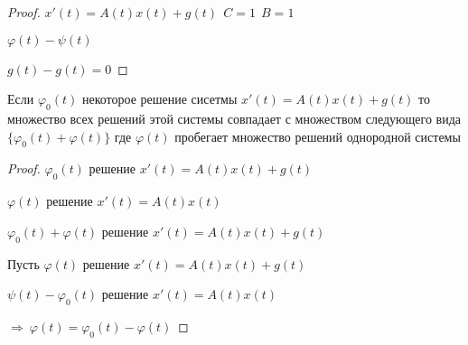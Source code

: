 \begin{proof}
  $x'(t) = A(t)x(t) + g(t) ~~ C = 1 ~~ B = 1$

  $\varphi(t) - \psi(t)$

  $g(t) - g(t) = 0$
\end{proof}

\begin{block}[Слудсвие 2]
  Если $\varphi_0(t)$ некоторое решение сисетмы $x'(t) = A(t)x(t) + g(t)$ то
  множество всех решений этой системы совпадает с множеством следующего вида
  $\{\varphi_0(t) + \varphi(t)\}$ где $\varphi(t)$ пробегает множество решений
  однородной системы
\end{block}

\begin{proof}
  $\varphi_0(t)$ решение $x'(t) = A(t)x(t) + g(t)$

  $\varphi(t)$ решение $x'(t) = A(t)x(t)$

  $\varphi_0(t) + \varphi(t)$ решение $x'(t) = A(t)x(t) + g(t)$

  Пусть $\varphi(t)$ решение $x'(t) = A(t)x(t) + g(t)$

  $\psi(t) - \varphi_0(t)$ решение $x'(t) = A(t)x(t)$

  $\Rightarrow ~ \varphi(t) = \varphi_0(t) - \varphi(t)$
\end{proof}
